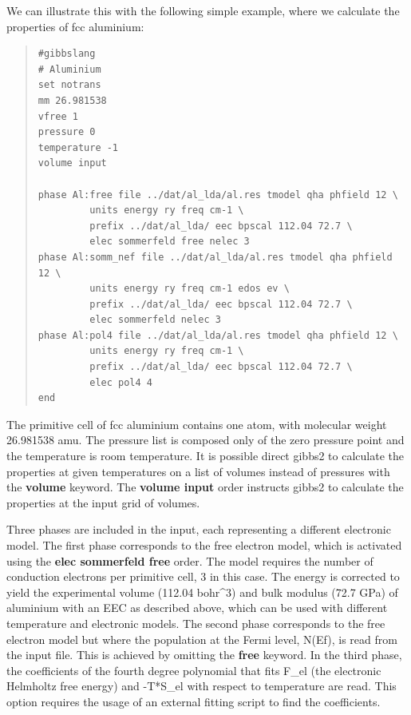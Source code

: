 \documentclass[a4paper]{article}
\begin{document}
We can illustrate this with the following simple example, where we
calculate the properties of fcc aluminium:

\begin{quote}
\begin{verbatim}
#gibbslang
# Aluminium
set notrans
mm 26.981538
vfree 1
pressure 0
temperature -1
volume input

phase Al:free file ../dat/al_lda/al.res tmodel qha phfield 12 \
         units energy ry freq cm-1 \
         prefix ../dat/al_lda/ eec bpscal 112.04 72.7 \
         elec sommerfeld free nelec 3
phase Al:somm_nef file ../dat/al_lda/al.res tmodel qha phfield 12 \
         units energy ry freq cm-1 edos ev \
         prefix ../dat/al_lda/ eec bpscal 112.04 72.7 \
         elec sommerfeld nelec 3
phase Al:pol4 file ../dat/al_lda/al.res tmodel qha phfield 12 \
         units energy ry freq cm-1 \
         prefix ../dat/al_lda/ eec bpscal 112.04 72.7 \
         elec pol4 4
end
\end{verbatim}
\end{quote}

The primitive cell of fcc aluminium contains one atom, with molecular
weight 26.981538 amu. The pressure list is composed only of the zero
pressure point and the temperature is room temperature. It is possible
direct gibbs2 to calculate the properties at given temperatures on a
list of volumes instead of pressures with the \textbf{volume} keyword. The
\textbf{volume input} order instructs gibbs2 to calculate the properties at
the input grid of volumes.

Three phases are included in the input, each representing a different
electronic model. The first phase corresponds to the free electron
model, which is activated using the \textbf{elec sommerfeld free}
order. The model requires the number of conduction electrons per
primitive cell, 3 in this case. The energy is corrected to yield the
experimental volume (112.04 bohr\textasciicircum{}3) and bulk modulus (72.7 GPa) of
aluminium with an EEC as described above, which can be used with
different temperature and electronic models. The second phase
corresponds to the free electron model but where the population at the
Fermi level, N(Ef), is read from the input file. This is achieved by
omitting the \textbf{free} keyword. In the third phase, the coefficients of
the fourth degree polynomial that fits F\_el (the electronic Helmholtz
free energy) and -T*S\_el with respect to temperature are read. This
option requires the usage of an external fitting script to find the
coefficients.
\end{document}
